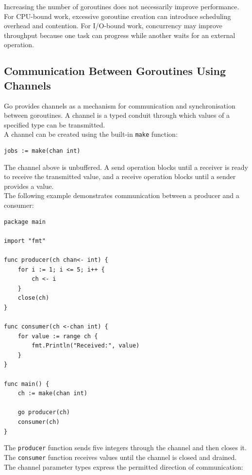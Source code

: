 Increasing the number of goroutines does not necessarily improve performance. For CPU-bound work, excessive goroutine creation can introduce scheduling overhead and contention. For I/O-bound work, concurrency may improve throughput because one task can progress while another waits for an external operation.\\

\subsection{Communication Between Goroutines Using Channels}

Go provides channels as a mechanism for communication and synchronisation between goroutines. A channel is a typed conduit through which values of a specified type can be transmitted.\\

A channel can be created using the built-in \texttt{make} function:

\begin{lstlisting}
jobs := make(chan int)
\end{lstlisting}

The channel above is unbuffered. A send operation blocks until a receiver is ready to receive the transmitted value, and a receive operation blocks until a sender provides a value.\\

The following example demonstrates communication between a producer and a consumer:

\begin{lstlisting}
package main

import "fmt"

func producer(ch chan<- int) {
    for i := 1; i <= 5; i++ {
        ch <- i
    }
    close(ch)
}

func consumer(ch <-chan int) {
    for value := range ch {
        fmt.Println("Received:", value)
    }
}

func main() {
    ch := make(chan int)

    go producer(ch)
    consumer(ch)
}
\end{lstlisting}

The \texttt{producer} function sends five integers through the channel and then closes it. The \texttt{consumer} function receives values until the channel is closed and drained.\\

The channel parameter types express the permitted direction of communication:

